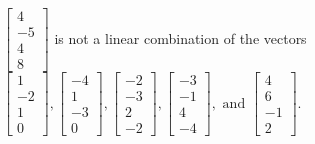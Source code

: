 \begin{exercise}
\begin{exerciseStatement}
  \end{exerciseStatement}
  \begin{exerciseAnswer}
   \(\left[\begin{array}{c}
4 \\
-5 \\
4 \\
8
\end{array}\right]\) 
  	 is not  
	a linear combination of the vectors \(\left[\begin{array}{c}
1 \\
-2 \\
1 \\
0
\end{array}\right] , \left[\begin{array}{c}
-4 \\
1 \\
-3 \\
0
\end{array}\right] , \left[\begin{array}{c}
-2 \\
-3 \\
2 \\
-2
\end{array}\right] , \left[\begin{array}{c}
-3 \\
-1 \\
4 \\
-4
\end{array}\right] , \text{ and } \left[\begin{array}{c}
4 \\
6 \\
-1 \\
2
\end{array}\right]\).

	
  


  \end{exerciseAnswer}
\end{exercise}